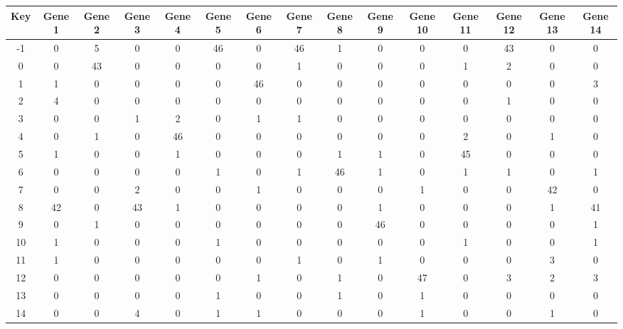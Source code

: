 \begin{tabular}{|c|c|c|c|c|c|c|c|c|c|c|c|c|c|c|}
\hline
Key & Gene 1 & Gene 2 & Gene 3 & Gene 4 & Gene 5 & Gene 6 & Gene 7 & Gene 8 & Gene 9 & Gene 10 & Gene 11 & Gene 12 & Gene 13 & Gene 14 \\
\hline
-1 & 0 & 5 & 0 & 0 & 46 & 0 & 46 & 1 & 0 & 0 & 0 & 43 & 0 & 0 \\
0 & 0 & 43 & 0 & 0 & 0 & 0 & 1 & 0 & 0 & 0 & 1 & 2 & 0 & 0 \\
1 & 1 & 0 & 0 & 0 & 0 & 46 & 0 & 0 & 0 & 0 & 0 & 0 & 0 & 3 \\
2 & 4 & 0 & 0 & 0 & 0 & 0 & 0 & 0 & 0 & 0 & 0 & 1 & 0 & 0 \\
3 & 0 & 0 & 1 & 2 & 0 & 1 & 1 & 0 & 0 & 0 & 0 & 0 & 0 & 0 \\
4 & 0 & 1 & 0 & 46 & 0 & 0 & 0 & 0 & 0 & 0 & 2 & 0 & 1 & 0 \\
5 & 1 & 0 & 0 & 1 & 0 & 0 & 0 & 1 & 1 & 0 & 45 & 0 & 0 & 0 \\
6 & 0 & 0 & 0 & 0 & 1 & 0 & 1 & 46 & 1 & 0 & 1 & 1 & 0 & 1 \\
7 & 0 & 0 & 2 & 0 & 0 & 1 & 0 & 0 & 0 & 1 & 0 & 0 & 42 & 0 \\
8 & 42 & 0 & 43 & 1 & 0 & 0 & 0 & 0 & 1 & 0 & 0 & 0 & 1 & 41 \\
9 & 0 & 1 & 0 & 0 & 0 & 0 & 0 & 0 & 46 & 0 & 0 & 0 & 0 & 1 \\
10 & 1 & 0 & 0 & 0 & 1 & 0 & 0 & 0 & 0 & 0 & 1 & 0 & 0 & 1 \\
11 & 1 & 0 & 0 & 0 & 0 & 0 & 1 & 0 & 1 & 0 & 0 & 0 & 3 & 0 \\
12 & 0 & 0 & 0 & 0 & 0 & 1 & 0 & 1 & 0 & 47 & 0 & 3 & 2 & 3 \\
13 & 0 & 0 & 0 & 0 & 1 & 0 & 0 & 1 & 0 & 1 & 0 & 0 & 0 & 0 \\
14 & 0 & 0 & 4 & 0 & 1 & 1 & 0 & 0 & 0 & 1 & 0 & 0 & 1 & 0 \\
\hline
\end{tabular}